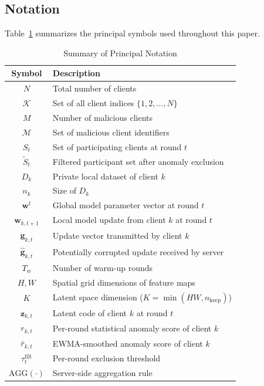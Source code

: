\documentclass[journal]{IEEEtran}
\begin{document}
\subsection{Notation}

Table~\ref{tab:notation} summarizes the principal symbols used throughout this paper.

\begin{table}[t]
\centering
\caption{Summary of Principal Notation}
\label{tab:notation}
\begin{tabular}{@{}cl@{}}
\toprule
\textbf{Symbol} & \textbf{Description} \\
\midrule
$N$ & Total number of clients \\
$\mathcal{K}$ & Set of all client indices $\{1, 2, \ldots, N\}$ \\
$M$ & Number of malicious clients \\
$\mathcal{M}$ & Set of malicious client identifiers \\
$S_t$ & Set of participating clients at round $t$ \\
$\tilde{S}_t$ & Filtered participant set after anomaly exclusion \\
$D_k$ & Private local dataset of client $k$ \\
$n_k$ & Size of $D_k$ \\
$\mathbf{w}^t$ & Global model parameter vector at round $t$ \\
$\mathbf{w}_{k,t+1}$ & Local model update from client $k$ at round $t$ \\
$\mathbf{g}_{k,t}$ & Update vector transmitted by client $k$ \\
$\hat{\mathbf{g}}_{k,t}$ & Potentially corrupted update received by server \\
$T_w$ & Number of warm-up rounds \\
$H, W$ & Spatial grid dimensions of feature maps \\
$K$ & Latent space dimension ($K = \min(HW, n_{\mathrm{keep}})$) \\
$\mathbf{z}_{k,t}$ & Latent code of client $k$ at round $t$ \\
$r_{k,t}$ & Per-round statistical anomaly score of client $k$ \\
$\bar r_{k,t}$ & EWMA-smoothed anomaly score of client $k$ \\
$\tau_t^{\text{filt}}$ & Per-round exclusion threshold \\
$\text{AGG}(\cdot)$ & Server-side aggregation rule \\
\bottomrule
\end{tabular}
\end{table}
\end{document}
